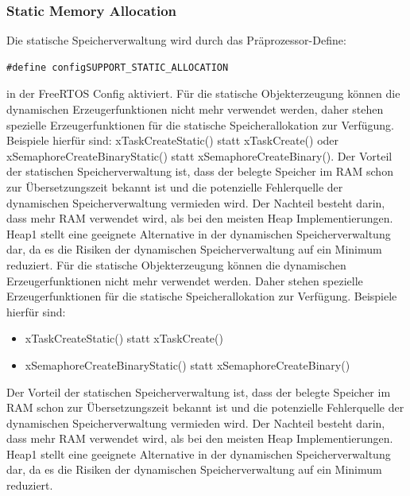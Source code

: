 \subsubsection{Static Memory Allocation}
Die statische Speicherverwaltung wird durch das Prä\-pro\-zes\-sor-Define:
\begin{lstlisting}[label=lst:staticMemory, numbers = none]
#define configSUPPORT_STATIC_ALLOCATION
\end{lstlisting}
in der FreeRTOS Config aktiviert. Für die statische Objekterzeugung können die dynamischen Erzeugerfunktionen nicht mehr verwendet werden, daher stehen spezielle Erzeugerfunktionen für die statische Speicherallokation zur Verfügung. Beispiele hierfür sind: xTaskCreateStatic() statt xTaskCreate() oder xSemaphoreCreateBinaryStatic() statt xSemaphoreCreateBinary(). Der Vorteil der statischen Speicherverwaltung ist, dass der belegte Speicher im RAM schon zur Übersetzungszeit bekannt ist und die potenzielle Fehlerquelle der dynamischen Speicherverwaltung vermieden wird. Der Nachteil besteht darin, dass mehr RAM verwendet wird, als bei den meisten Heap Implementierungen. Heap1 stellt eine geeignete Alternative in der dynamischen Speicherverwaltung dar, da es die Risiken der dynamischen Speicherverwaltung auf ein Minimum reduziert.   
Für die statische Objekterzeugung können die dynamischen Erzeugerfunktionen nicht mehr verwendet werden. Daher stehen spezielle Erzeugerfunktionen für die statische Speicherallokation zur Verfügung. Beispiele hierfür sind: 
\begin{itemize}
	\item xTaskCreateStatic() statt xTaskCreate()
	\item xSemaphoreCreateBinaryStatic() statt xSemaphoreCreateBinary()
\end{itemize}
Der Vorteil der statischen Speicherverwaltung ist, dass der belegte Speicher im RAM schon zur Übersetzungszeit bekannt ist und die potenzielle Fehlerquelle der dynamischen Speicherverwaltung vermieden wird. Der Nachteil besteht darin, dass mehr RAM verwendet wird, als bei den meisten Heap Implementierungen. Heap1 stellt eine geeignete Alternative in der dynamischen Speicherverwaltung dar, da es die Risiken der dynamischen Speicherverwaltung auf ein Minimum reduziert.   